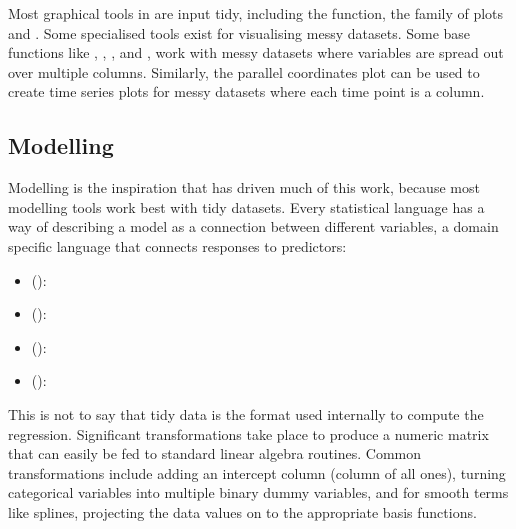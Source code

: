 \documentclass[article]{jss}
\begin{document}
Most graphical tools in  are input tidy, including the   function, the  family of plots \citep{sarkar:2008} and  \citep{me:ggplot2}. Some specialised tools exist for visualising messy datasets. Some base  functions like , , , and , work with messy datasets where variables are spread out over multiple columns. Similarly, the parallel coordinates plot \citep{wegman:1990,inselberg:1985} can be used to create time series plots for messy datasets where each time point is a column.

\subsection{Modelling}
\label{sub:modelling}

Modelling is the inspiration that has driven much of this work, because most modelling tools work best with tidy datasets. Every statistical language has a way of describing a model as a connection between different variables, a domain specific language that connects responses to predictors: 

\begin{itemize}

  \item {} (): 

  \item {} (): 

  \item {} (): 

  \item {} (): 


\end{itemize}

This is not to say that tidy data is the format used internally to compute the regression. Significant transformations take place to produce a numeric matrix that can easily be fed to standard linear algebra routines. Common transformations include adding an intercept column (column of all ones), turning categorical variables into multiple binary dummy variables, and for smooth terms like splines, projecting the data values on to the appropriate basis functions.

\end{document}

